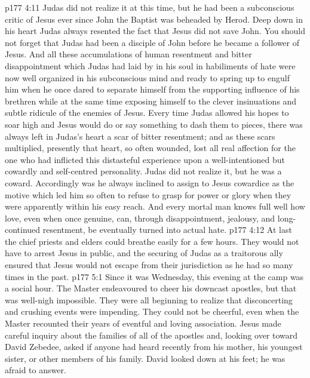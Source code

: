 \vs p177 4:11 Judas did not realize it at this time, but he had been a subconscious critic of Jesus ever since John the Baptist was beheaded by Herod. Deep down in his heart Judas always resented the fact that Jesus did not save John. You should not forget that Judas had been a disciple of John before he became a follower of Jesus. And all these accumulations of human resentment and bitter disappointment which Judas had laid by in his soul in habiliments of hate were now well organized in his subconscious mind and ready to spring up to engulf him when he once dared to separate himself from the supporting influence of his brethren while at the same time exposing himself to the clever insinuations and subtle ridicule of the enemies of Jesus. Every time Judas allowed his hopes to soar high and Jesus would do or say something to dash them to pieces, there was always left in Judas’s heart a scar of bitter resentment; and as these scars multiplied, presently that heart, so often wounded, lost all real affection for the one who had inflicted this distasteful experience upon a well\hyp{}intentioned but cowardly and self\hyp{}centred personality. Judas did not realize it, but he was a coward. Accordingly was he always inclined to assign to Jesus cowardice as the motive which led him so often to refuse to grasp for power or glory when they were apparently within his easy reach. And every mortal man knows full well how love, even when once genuine, can, through disappointment, jealousy, and long\hyp{}continued resentment, be eventually turned into actual hate.
\vs p177 4:12 At last the chief priests and elders could breathe easily for a few hours. They would not have to arrest Jesus in public, and the securing of Judas as a traitorous ally ensured that Jesus would not escape from their jurisdiction as he had so many times in the past.
\vs p177 5:1 Since it was Wednesday, this evening at the camp was a social hour. The Master endeavoured to cheer his downcast apostles, but that was well\hyp{}nigh impossible. They were all beginning to realize that disconcerting and crushing events were impending. They could not be cheerful, even when the Master recounted their years of eventful and loving association. Jesus made careful inquiry about the families of all of the apostles and, looking over toward David Zebedee, asked if anyone had heard recently from his mother, his youngest sister, or other members of his family. David looked down at his feet; he was afraid to answer.
